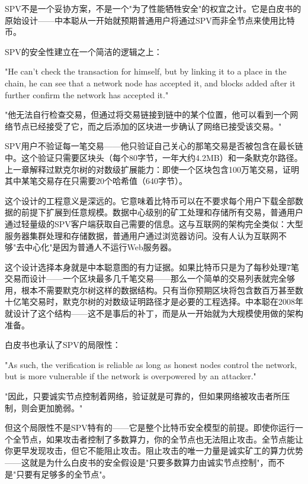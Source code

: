 \documentclass[a4paper,12pt,openany]{ctexbook}
\newenvironment{quoting}{%
  \par\vspace{0.5em}%
  \begin{list}{}{%
    \setlength{\leftmargin}{2em}%
    \setlength{\rightmargin}{2em}%
    \setlength{\parsep}{0.3em}%
    \setlength{\itemsep}{0pt}%
    \setlength{\topsep}{0pt}%
  }%
  \item\relax
}{%
  \end{list}%
  \par\vspace{0.5em}%
}
\begin{document}
SPV不是一个妥协方案，不是一个"为了性能牺牲安全"的权宜之计。它是白皮书的原始设计——中本聪从一开始就预期普通用户将通过SPV而非全节点来使用比特币。

SPV的安全性建立在一个简洁的逻辑之上：


\begin{quoting}
\small
"He can't check the transaction for himself, but by linking it to a place in the chain, he can see that a network node has accepted it, and blocks added after it further confirm the network has accepted it."

"他无法自行检查交易，但通过将交易链接到链中的某个位置，他可以看到一个网络节点已经接受了它，而之后添加的区块进一步确认了网络已接受该交易。"
\end{quoting}


SPV用户不验证每一笔交易——他只验证自己关心的那笔交易是否被包含在最长链中。这个验证只需要区块头（每个80字节，一年大约4.2MB）和一条默克尔路径。上一章解释过默克尔树的对数级扩展能力：即使一个区块包含100万笔交易，证明其中某笔交易存在只需要20个哈希值（640字节）。

这个设计的工程意义是深远的。它意味着比特币可以在不要求每个用户下载全部数据的前提下扩展到任意规模。数据中心级别的矿工处理和存储所有交易，普通用户通过轻量级的SPV客户端获取自己需要的信息。这与互联网的架构完全类似：大型服务器集群处理和存储数据，普通用户通过浏览器访问。没有人认为互联网不够"去中心化"是因为普通人不运行Web服务器。

这个设计选择本身就是中本聪意图的有力证据。如果比特币只是为了每秒处理7笔交易而设计——一个区块最多几千笔交易——那么一个简单的交易列表就完全够用，根本不需要默克尔树这样的数据结构。只有当你预期区块将包含数百万甚至数十亿笔交易时，默克尔树的对数级证明路径才是必要的工程选择。中本聪在2008年就设计了这个结构——这不是事后的补丁，而是从一开始就为大规模使用做的架构准备。

白皮书也承认了SPV的局限性：


\begin{quoting}
\small
"As such, the verification is reliable as long as honest nodes control the network, but is more vulnerable if the network is overpowered by an attacker."

"因此，只要诚实节点控制着网络，验证就是可靠的，但如果网络被攻击者所压制，则会更加脆弱。"
\end{quoting}


但这个局限性不是SPV特有的——它是整个比特币安全模型的前提。即使你运行一个全节点，如果攻击者控制了多数算力，你的全节点也无法阻止攻击。全节点能让你更早发现攻击，但它不能阻止攻击。阻止攻击的唯一力量是诚实矿工的算力优势——这就是为什么白皮书的安全假设是"只要多数算力由诚实节点控制"，而不是"只要有足够多的全节点"。
\end{document}
